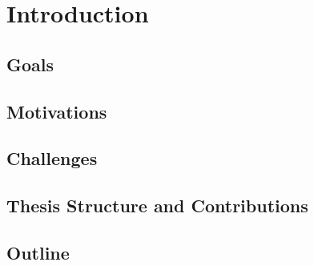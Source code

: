 \chapter{Introduction}

\section{Goals}

\section{Motivations}

\section{Challenges}

\section{Thesis Structure and Contributions}

\section{Outline}
